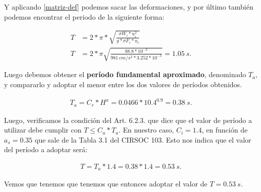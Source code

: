 \documentclass[../main.tex]{subfiles}
\begin{document}
Y aplicando \cref{matriz-def} podemos sacar las deformaciones, y por último también
podemos encontrar el periodo de la siguiente forma:

\begin{align*}
  T &= 2 * \pi * \sqrt{\frac{\sigma W_i * u_i^2}{g*\sigma F_i*u_i}}  \\[5pt]
  T &= 2*\pi \sqrt{\frac{88.8*10^{-3}}{\SI{981}{cm / s^2}*3.252*10^{-3}}} = \SI{1.05}{s}
.\end{align*}

Luego debemos obtener el \textbf{período fundamental aproximado},
denominado $T_a$, y compararlo y adoptar el menor entre los dos valores de 
períodos obtenidos.

\begin{align*}
  T_a = C_r * H^x = 0.0466 * 10.4^{0.9} = \SI{0.38}{s} 
.\end{align*}

Luego, verificamos la condición del Art. 6.2.3. que dice que el valor de período
a utilizar debe cumplir con $T \leq C_u * T_a$. En nuestro caso, $C_i = 1.4 $, 
en función de  $a_s = 0.35$ que sale de la Tabla 3.1 del CIRSOC 103. Esto nos indica
que el valor del período a adoptar será:

\begin{align*}
  T = T_a * 1.4 = 0.38 * 1.4 = \SI{0.53}{s}
.\end{align*}

 Vemos que tenemos que tenemos que entonces adoptar el valor de $T = \SI{0.53}{s}$.

\end{document}
